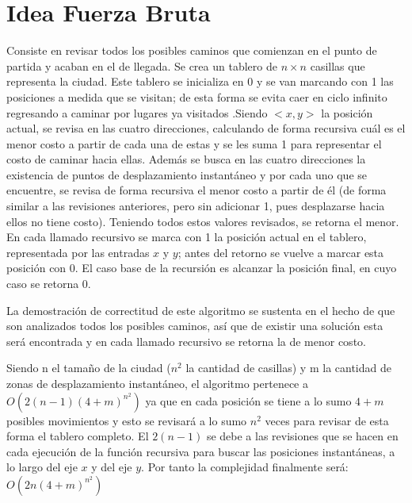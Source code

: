 \documentclass[a4paper,12pt,twocolumn]{article}
\begin{document}
	\section{Idea Fuerza Bruta}
		Consiste en revisar todos los posibles caminos que comienzan en el punto de partida y acaban en el de llegada. Se crea un tablero de $n \times n$ casillas que representa la ciudad. Este tablero se inicializa en 0 y se van marcando con 1 las posiciones a medida que se visitan; de esta forma se evita caer en ciclo infinito regresando a caminar por lugares ya visitados .Siendo $<x, y>$ la posición actual, se revisa en las cuatro direcciones, calculando de forma recursiva cuál es el menor costo a partir de cada una de estas y se les suma 1 para representar el costo de caminar hacia ellas. Además se busca en las cuatro direcciones la existencia de puntos de desplazamiento instantáneo y por cada uno que se encuentre, se revisa de forma recursiva el menor costo a partir de él (de forma similar a las revisiones anteriores, pero sin adicionar 1, pues desplazarse hacia ellos no tiene costo). Teniendo todos estos valores revisados, se retorna el menor. En cada llamado recursivo se marca con 1 la posición actual en el tablero, representada por las entradas $x$ y $y$; antes del retorno se vuelve a marcar esta posición con 0. El caso base de la recursión es alcanzar la posición final, en cuyo caso se retorna 0.
		
		La demostración de correctitud de este algoritmo se sustenta en el hecho de que son analizados todos los posibles caminos, así que de existir una solución esta será encontrada y en cada llamado recursivo se retorna la de menor costo.
		
		Siendo n el tamaño de la ciudad ($n^2$ la cantidad de casillas) y m la cantidad de zonas de desplazamiento instantáneo, el algoritmo pertenece a $O(2(n-1)(4 + m) ^{ n^2} )$ ya que en cada posición se tiene a lo sumo $4 + m$ posibles movimientos y esto se revisará a lo sumo $n^2$ veces para revisar de esta forma el tablero completo. El $2(n-1)$ se debe a las revisiones que se hacen en cada ejecución de la función recursiva para buscar las posiciones instantáneas, a lo largo del eje $x$ y del eje $y$. Por tanto la complejidad finalmente será: $O( 2n ( 4 + m) ^{ n ^ 2})$
\end{document}

